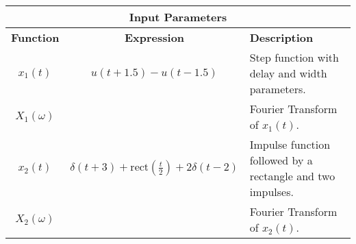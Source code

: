 \documentclass{article}
\begin{document}
\begin{table}[htbp]
    \centering
    \begin{tabular}{|c|c|p{6cm}|}
        \hline
        \multicolumn{3}{|c|}{\textbf{Input Parameters}} \\
        \hline
        \textbf{Function} & \textbf{Expression} & \textbf{Description} \\
        \hline
        $x_1(t)$ & $u(t + 1.5) - u(t - 1.5)$ & Step function with delay and width parameters. \\
        \hline
        $X_1(\omega)$ &  & Fourier Transform of $x_1(t)$. \\
        \hline
        $x_2(t)$ & $\delta(t + 3) + \text{rect}\left(\frac{t}{2}\right) + 2\delta(t - 2)$ & Impulse function followed by a rectangle and two impulses. \\
        \hline
        $X_2(\omega)$ &  & Fourier Transform of $x_2(t)$. \\
        \hline
    \end{tabular}
\end{table}
\end{document}
